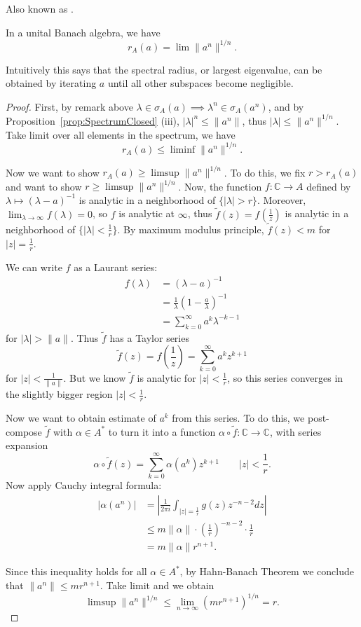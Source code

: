 \begin{theorem}
	Also known as .
	\label{thm:GelfandFormula}

	In a unital Banach algebra, we have
	\[
		r_A(a) = \lim \|a^n\|^{1 / n}
	.\] 
\end{theorem}
	Intuitively this says that the spectral radius, or largest eigenvalue, can be obtained by iterating $a$ until all other subspaces become negligible.
\begin{proof}
	First, by remark above $\lambda \in \sigma_A(a) \implies\lambda^n \in \sigma_A(a^n)$, and by Proposition~\ref{prop:SpectrumClosed} (iii), $|\lambda|^n \le \|a^n\|$, thus $|\lambda| \le \|a^n\|^{1 / n}$. Take limit over all elements in the spectrum, we have
	\[
		r_A(a) \le \liminf \|a^n\|^{1 / n}
	.\] 

	Now we want to show $r_A(a) \ge  \limsup \|a^n\|^{1 / n}$. To do this, we fix $r > r_A(a)$ and want to show $r \ge  \limsup \|a^n\|^{1 / n}$.
	Now, the function $f: \mathbb{C} \to A$ defined by $\lambda \mapsto (\lambda - a)^{- 1}$ is analytic in a neighborhood of $\{|\lambda| > r\} $. Moreover, $\lim_{\lambda \to \infty } f(\lambda) = 0$, so $f$ is analytic at $ \infty$, thus $\tilde f(z)= f(\frac{1}{z} )$ is analytic in a neighborhood of $\{|\lambda| < \frac{1}{r}\} $. By maximum modulus principle, $\tilde f( z) < m$ for $|z| = \frac{1}{r}$.

	We can write $f$ as a Laurant series:
	\begin{align*}
		f(\lambda) &= (\lambda - a)^{-1}\\
		&= \frac{1}{\lambda} (1 - \frac{a}{\lambda})^{-1} \\
		&= \sum_{k=0}^{\infty} a^k \lambda^{ - k - 1}
	\end{align*}
	for $|\lambda| > \|a\|$. Thus $\tilde f$ has a Taylor series 
	\[
		\tilde f(z) = f(\frac{1}{z}) = \sum_{k = 0}^{\infty } a^k z^{k + 1}
	\] 
	for $|z| < \frac{1}{\|a\|}$. But we know $\tilde f$ is analytic for $|z| < \frac{1}{r}$, so this series converges in the slightly bigger region $|z| < \frac{1}{r}$.

	Now we want to obtain estimate of $a^k$ from this series. To do this, we post-compose $\tilde f$ with $\alpha \in A^*$ to turn it into a function $\alpha \circ \tilde f : \mathbb{C} \to \mathbb{C}$, with series expansion
\[
\alpha \circ \tilde f(z) = \sum_{k = 0}^{\infty } \alpha(a^k) z^{k + 1} \qquad |z| < \frac{1}{r}
.\] 
	Now apply Cauchy integral formula:
	\begin{align*}
		|\alpha(a^n)| &= \left| \frac{1}{2 \pi i} \int _{|z| = \frac{1}{r}} g(z) z^{- n - 2} dz\right|  \\
		&\leq m \|\alpha\| \cdot (\frac{1}{r})^{- n - 2} \cdot \frac{1}{r} \\
		&= m \|\alpha\| r^{n + 1}
	.\end{align*}

	Since this inequality holds for all $\alpha \in A^*$, by Hahn-Banach Theorem we conclude that $\|a^n\| \le m r^{n + 1}$. Take limit and we obtain
	\[
		\limsup \|a^n\|^{1 / n} \le \lim_{n \to \infty } (m r^{n + 1})^{1 / n} = r
	.\] 
\end{proof}
